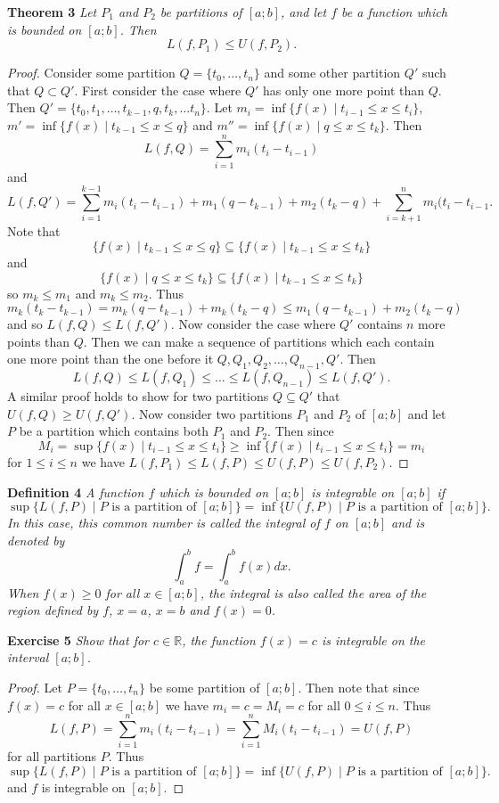 \documentclass{article}
\begin{document}
\begin{flushleft}
\textbf{Theorem 3}
\textsl{Let $P_1$ and $P_2$ be partitions of $[a;b]$, and let $f$ be a function which is bounded on $[a;b]$. Then
\[
L(f,P_1) \leq U(f,P_2).
\]}
\begin{proof}
Consider some partition $Q = \{t_0, \dots , t_n\}$ and some other partition $Q'$ such that $Q \subset Q'$. First consider the case where $Q'$ has only one more point than $Q$. Then $Q' = \{t_0, t_1, \dots , t_{k-1}, q, t_k, \dots t_n\}$. Let $m_i = \inf \{f(x) \mid t_{i-1} \leq x \leq t_i\}$, $m' = \inf \{f(x) \mid t_{k-1} \leq x \leq q\}$ and $m'' = \inf \{f(x) \mid q \leq x \leq t_k\}$. Then
\[
L(f,Q) = \sum_{i=1}^n m_i (t_i - t_{i-1})
\]
and
\[
L(f,Q') = \sum_{i=1}^{k-1} m_i (t_i-t_{i-1}) + m_1 (q-t_{k-1}) + m_2 (t_k-q) + \sum_{i=k+1}^n m_i (t_i-t_{i-1}.
\]
Note that
\[
\{f(x) \mid t_{k-1} \leq x \leq q\} \subseteq \{f(x) \mid t_{k-1} \leq x \leq t_k\}
\]
and
\[
\{f(x) \mid q \leq x \leq t_k\} \subseteq \{f(x) \mid t_{k-1} \leq x \leq t_k\}
\]
so $m_k \leq m_1$ and $m_k \leq m_2$. Thus
\[
m_k (t_k - t_{k-1}) = m_k (q - t_{k-1}) + m_k (t_k - q) \leq m_1 (q - t_{k-1}) + m_2 (t_k - q)
\]
and so $L(f,Q) \leq L(f,Q')$. Now consider the case where $Q'$ contains $n$ more points than $Q$. Then we can make a sequence of partitions which each contain one more point than the one before it $Q, Q_1, Q_2, \dots , Q_{n-1}, Q'$. Then
\[
L(f,Q) \leq L(f,Q_1) \leq \dots \leq L(f,Q_{n-1}) \leq L(f,Q').
\]
A similar proof holds to show for two partitions $Q \subseteq Q'$ that $U(f,Q) \geq U(f,Q')$. Now consider two partitions $P_1$ and $P_2$ of $[a;b]$ and let $P$ be a partition which contains both $P_1$ and $P_2$. Then since
\[
M_i = \sup \{f(x) \mid t_{i-1} \leq x \leq t_i\} \geq \inf \{f(x) \mid t_{i-1} \leq x \leq t_i\} = m_i
\]
for $1 \leq i \leq n$ we have $L(f,P_1) \leq L(f,P) \leq U(f,P) \leq U(f,P_2)$.
\end{proof}

\textbf{Definition 4}
\textsl{A function $f$ which is bounded on $[a;b]$ is integrable on $[a;b]$ if
\[
\sup \{L(f,P) \mid \text{$P$ is a partition of $[a;b]$} \} = \inf \{U(f,P) \mid \text{$P$ is a partition of $[a;b]$} \}.
\]
In this case, this common number is called the integral of $f$ on $[a;b]$ and is denoted by
\[
\int_a^b f = \int_a^b f(x) dx.
\]
When $f(x) \geq 0$ for all $x \in [a;b]$, the integral is also called the area of the region defined by $f$, $x=a$, $x=b$ and $f(x) = 0$.}\newline

\textbf{Exercise 5}
\textsl{Show that for $c \in \mathbb{R}$, the function $f(x) = c$ is integrable on the interval $[a;b]$.}
\begin{proof}
Let $P = \{t_0, \dots , t_n\}$ be some partition of $[a;b]$. Then note that since $f(x) = c$ for all $x \in [a;b]$ we have $m_i = c = M_i = c$ for all $0 \leq i \leq n$. Thus
\[
L(f,P) = \sum_{i=1}^n m_i (t_i-t_{i-1}) = \sum_{i=1}^n M_i (t_i-t_{i-1}) = U(f,P)
\]
for all partitions $P$. Thus
\[
\sup \{L(f,P) \mid \text{$P$ is a partition of $[a;b]$} \} = \inf \{U(f,P) \mid \text{$P$ is a partition of $[a;b]$} \}.
\]
and $f$ is integrable on $[a;b]$.
\end{proof}


\end{flushleft}
\end{document}
